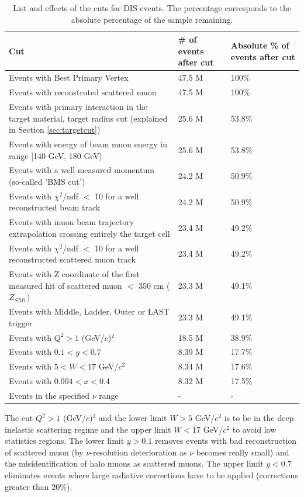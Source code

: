 \begin{table}[!h]
  \centering
  \caption{List and effects of the cuts for DIS events. The percentage corresponds to the absolute percentage of the sample remaining.}
  \label{tab:DIScuts}
  \begin{tabular}{p{10cm} p{2cm} p{2cm}}
    \hline
    \hline
     Cut & \# of events after cut & Absolute \% of events after cut  \\
    \hline
    \hline
    Events with Best Primary Vertex & 47.5 M & 100\% \\
    Events with reconstruted scattered muon & 47.5 M & 100\% \\
    Events with primary interaction in the target material, target radius cut (explained in Section \ref{sec:targetcut}) & 25.6 M & 53.8\% \\
    Events with energy of beam muon energy in range [140 GeV, 180 GeV] & 25.6 M & 53.8\% \\
    Events with a well measured momentum (so-called 'BMS cut') & 24.2 M & 50.9\% \\
    Events with $\chi^2$/ndf $<$ 10 for a well reconstructed beam track & 24.2 M & 50.9\% \\
    Events with muon beam trajectory extrapolation crossing entirely the target cell & 23.4 M & 49.2\% \\
    Events with $\chi^2$/ndf $<$ 10 for a well reconstructed scattered muon track & 23.4 M & 49.2\% \\
    Events with Z coordinate of the first measured hit of scattered muon $<$ 350 cm ($Z_{SM1}$) & 23.3 M & 49.1\% \\
    Events with Middle, Ladder, Outer or LAST trigger & 23.3 M & 49.1\% \\
    Events with $Q^2>1$ (GeV/$c$)$^2$ & 18.5 M & 38.9\% \\
    Events with $0.1 < y < 0.7$ & 8.39 M & 17.7\% \\
    Events with $5 < W < 17$ GeV/$c^2$ & 8.34 M & 17.6\% \\
    Events with $0.004 < x < 0.4$ & 8.32 M & 17.5\% \\
    Events in the specified $\nu$ range & - & - \\
    \hline
    \hline
  \end{tabular}
\end{table}

The cut $Q^2>1$ (GeV/$c$)$^2$ and the lower limit $W > 5$ GeV/$c^2$ is to be in the deep inelastic scattering regime and the upper limit $W < 17$ GeV/$c^2$ to avoid low statistics regions. The lower limit $y > 0.1$ removes events with bad reconstruction of scattered muon (by $\nu$-resolution deterioration as $\nu$ becomes really small) and the misidentification of halo muons as scattered muons. The upper limit $y < 0.7$ eliminates events where large radiative corrections have to be applied (corrections greater than $20$\%).

